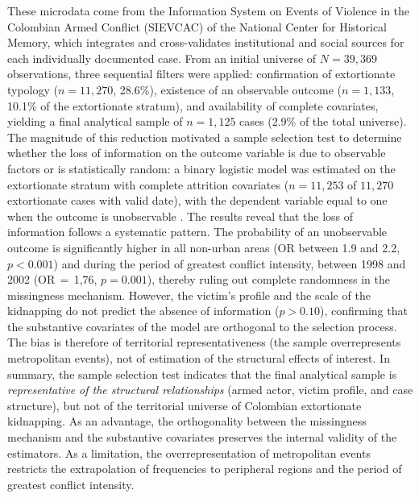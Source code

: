 \documentclass[ecta,nameyear,draft]{econsocart}
\theoremstyle{plain}
\theoremstyle{definition}
\newcommand{\1}{\mathbf{1}}
\begin{document}
These microdata come from the Information System on Events of Violence in the Colombian Armed Conflict (SIEVCAC) of the National Center for Historical Memory, which integrates and cross-validates institutional and social sources for each individually documented case. From an initial universe of $N=39,369$ observations, three sequential filters were applied: confirmation of extortionate typology ($n=11,270$, 28.6\%), existence of an observable outcome ($n=1,133$, 10.1\% of the extortionate stratum), and availability of complete covariates, yielding a final analytical sample of $n=1,125$ cases (2.9\% of the total universe). The magnitude of this reduction motivated a sample selection test to determine whether the loss of information on the outcome variable is due to observable factors or is statistically random: a binary logistic model was estimated on the extortionate stratum with complete attrition covariates ($n=11,253$ of $11,270$ extortionate cases with valid date), with the dependent variable equal to one when the outcome is unobservable \citet{LittleRubin2020}. The results reveal that the loss of information follows a systematic pattern. The probability of an unobservable outcome is significantly higher in all non-urban areas (OR between 1.9 and 2.2, $p<0.001$) and during the period of greatest conflict intensity, between 1998 and 2002 (OR$\,=\,$1{,}76, $p=0.001$), thereby ruling out complete randomness in the missingness mechanism. However, the victim's profile and the scale of the kidnapping do not predict the absence of information ($p>0.10$), confirming that the substantive covariates of the model are orthogonal to the selection process. The bias is therefore of territorial representativeness (the sample overrepresents metropolitan events), not of estimation of the structural effects of interest. In summary, the sample selection test indicates that the final analytical sample is \textit{representative of the structural relationships} (armed actor, victim profile, and case structure), but not of the territorial universe of Colombian extortionate kidnapping. As an advantage, the orthogonality between the missingness mechanism and the substantive covariates preserves the internal validity of the estimators. As a limitation, the overrepresentation of metropolitan events restricts the extrapolation of frequencies to peripheral regions and the period of greatest conflict intensity.
\end{document}
